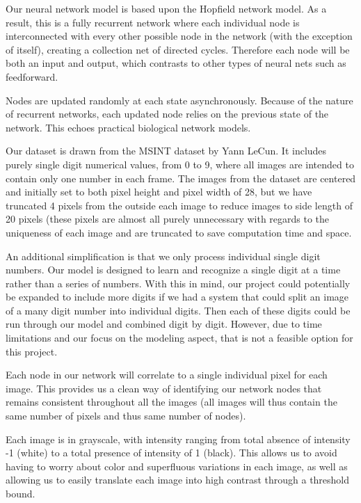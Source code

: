 \documentclass[]{article}
\theoremstyle{plain}
\theoremstyle{definition}
\begin{document}
Our neural network model is based upon the Hopfield network model.  As a result, this is a fully recurrent network where each individual node is interconnected with every other possible node in the network (with the exception of itself), creating a collection net of directed cycles.  Therefore each node will be both an input and output, which contrasts to other types of neural nets such as feedforward.


Nodes are updated randomly at each state asynchronously.  Because of the nature of recurrent networks, each updated node relies on the previous state of the network.  This echoes practical biological network models.


	Our dataset is drawn from the MSINT dataset by Yann LeCun.
It includes purely single digit numerical values, from 0 to 9, where all images are intended to contain only one number in each frame.  The images from the dataset are centered and initially set to both pixel height and pixel width of 28, but we have truncated 4 pixels from the outside each image to reduce images to side length of 20 pixels (these pixels are almost all purely unnecessary with regards to the uniqueness of each image and are truncated to save computation time and space.


	An additional simplification is that we only process individual single digit numbers.  Our model is designed to learn and recognize a single digit at a time rather than a series of numbers.  With this in mind, our project could potentially be expanded to include more digits if we had a system that could split an image of a many digit number into individual digits.  Then each of these digits could be run through our model and combined digit by digit.  However, due to time limitations and our focus on the modeling aspect, that is not a feasible option for this project.
	

Each node in our network will correlate to a single individual pixel for each image.  This provides us a clean way of identifying our network nodes that remains consistent throughout all the images (all images will thus contain the same number of pixels and thus same number of nodes).


Each image is in grayscale, with intensity ranging from total absence of intensity -1 (white) to a total presence of intensity of 1 (black).  This allows us to avoid having to worry about color and superfluous variations in each image, as well as allowing us to easily translate each image into high contrast through a threshold bound.
\end{document}
